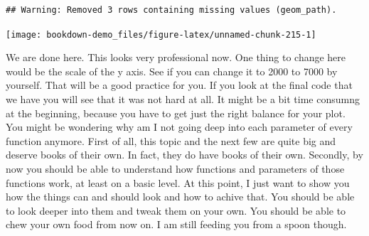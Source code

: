 \documentclass[]{book}
\newenvironment{Shaded}{\begin{snugshade}}{\end{snugshade}}
\newcommand{\CommentTok}[1]{\textcolor[rgb]{0.56,0.35,0.01}{\textit{#1}}}
\newcommand{\DataTypeTok}[1]{\textcolor[rgb]{0.13,0.29,0.53}{#1}}
\newcommand{\DecValTok}[1]{\textcolor[rgb]{0.00,0.00,0.81}{#1}}
\newcommand{\FloatTok}[1]{\textcolor[rgb]{0.00,0.00,0.81}{#1}}
\newcommand{\KeywordTok}[1]{\textcolor[rgb]{0.13,0.29,0.53}{\textbf{#1}}}
\newcommand{\NormalTok}[1]{#1}
\newcommand{\OperatorTok}[1]{\textcolor[rgb]{0.81,0.36,0.00}{\textbf{#1}}}
\newcommand{\StringTok}[1]{\textcolor[rgb]{0.31,0.60,0.02}{#1}}
\begin{document}
\begin{Shaded}
\end{Shaded}

\begin{verbatim}
## Warning: Removed 3 rows containing missing values (geom_path).
\end{verbatim}

\begin{center}\texttt{[image: bookdown-demo\_files/figure-latex/unnamed-chunk-215-1]} \end{center}

We are done here. This looks very professional now. One thing to change here would be the scale of the y axis. See if you can change it to 2000 to 7000 by yourself. That will be a good practice for you. If you look at the final code that we have you will see that it was not hard at all. It might be a bit time consumng at the beginning, because you have to get just the right balance for your plot. You might be wondering why am I not going deep into each parameter of every function anymore. First of all, this topic and the next few are quite big and deserve books of their own. In fact, they do have books of their own. Secondly, by now you should be able to understand how functions and parameters of those functions work, at least on a basic level. At this point, I just want to show you how the things can and should look and how to achive that. You should be able to look deeper into them and tweak them on your own. You should be able to chew your own food from now on. I am still feeding you from a spoon though.
\end{document}
